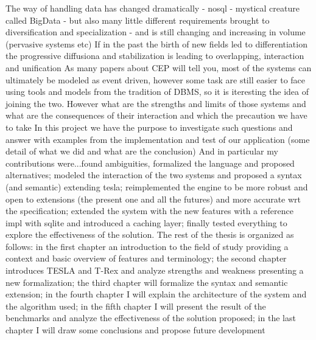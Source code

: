 The way of handling data has changed dramatically - nosql - mystical creature called BigData - but also many little different requirements brought to diversification and specialization - and is still changing and increasing in volume (pervasive systems etc)
If in the past the birth of new fields led to differentiation the progressive diffusiona and stabilization is leading to overlapping, interaction and unification
As many papers about CEP will tell you, most of the systems can ultimately be modeled as event driven, however some task are still easier to face using tools and models from the tradition of DBMS, so it is iteresting the idea of joining the two.
However what are the strengths and limits of those systems and what are the consequences of their interaction and which the precaution we have to take
In this project we have the purpose to investigate such questions and answer with examples from the implementation and test of our application (some detail of what we did and what are the conclusion)
And in particular my contributions were...found ambiguities, formalized the language and proposed alternatives; modeled the interaction of the two systems and proposed a syntax (and semantic) extending tesla; reimplemented the engine to be more robust and open to extensions (the present one and all the futures) and more accurate wrt the specification; extended the system with the new features with a reference impl with sqlite and introduced a caching layer; finally tested everything to explore the effectiveness of the solution.
The rest of the thesis is organized as follows: in the first chapter an introduction to the field of study providing a context and basic overview of features and terminology; the second chapter introduces TESLA and T-Rex and analyze strengths and weakness presenting a new formalization; the third chapter will formalize the syntax and semantic extension; in the fourth chapter I will explain the architecture of the system and the algorithm used; in the fifth chapter I will present the result of the benchmarks and analyze the effectiveness of the solution proposed; in the last chapter I will draw some conclusions and propose future development

